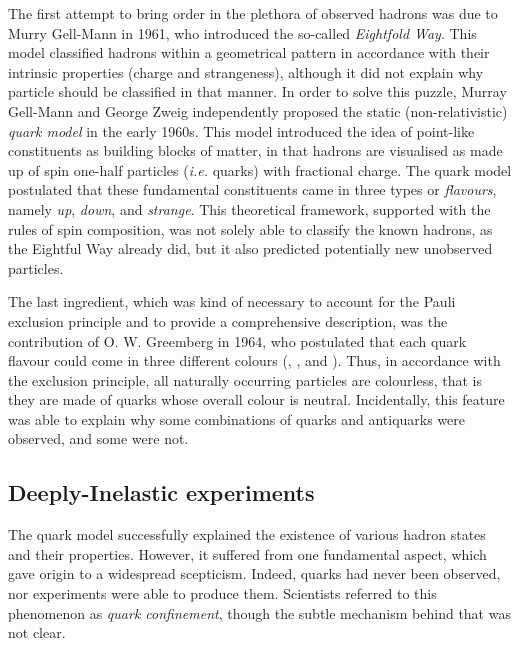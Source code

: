 The first attempt to bring order in the plethora of observed hadrons was due to Murry Gell-Mann in 1961, who introduced the so-called \textit{Eightfold Way}. This model classified hadrons within a geometrical pattern in accordance with their intrinsic properties (charge and strangeness), although it did not explain why particle should be classified in that manner. In order to solve this puzzle, Murray Gell-Mann and George Zweig independently proposed the static (non-relativistic) \textit{quark model} in the early 1960s. This model introduced the idea of point-like constituents as building blocks of matter, in that hadrons are visualised as made up of spin one-half particles (\textit{i.e.} quarks) with fractional charge. The quark model postulated that these fundamental constituents came in three types or \textit{flavours}, namely \textit{up}, \textit{down}, and \textit{strange}. This theoretical framework, supported with the rules of spin composition, was not solely able to classify the known hadrons, as the Eightful Way already did, but it also predicted potentially new unobserved particles.%

The last ingredient, which was kind of necessary to account for the Pauli exclusion principle and to provide a comprehensive description, was the contribution of O. W. Greemberg in 1964, who postulated that each quark flavour could come in three different colours (, , and ). Thus, in accordance with the exclusion principle, all naturally occurring particles are colourless, that is they are made of quarks whose overall colour is neutral. Incidentally, this feature was able to explain why some combinations of quarks and antiquarks were observed, and some were not.%

\subsection*{Deeply-Inelastic experiments}

The quark model successfully explained the existence of various hadron states and their properties. However, it suffered from one fundamental aspect, which gave origin to a widespread scepticism. Indeed, quarks had never been observed, nor experiments were able to produce them. Scientists referred to this phenomenon as \textit{quark confinement}, though the subtle mechanism behind that was not clear.

